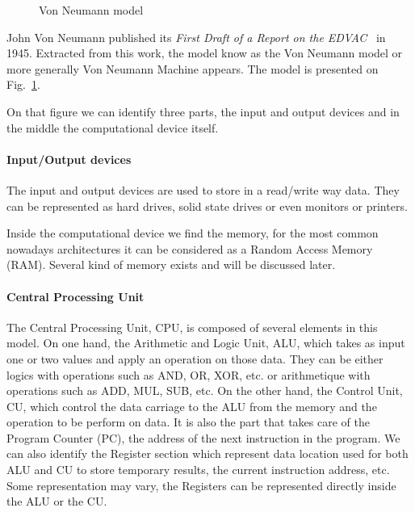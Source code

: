 \begin{figure}
\centering 
{}
\caption{Von Neumann model}
\label{fig:1_HPC:von_neumann_model}
\end{figure}

John Von Neumann published its \textit{First Draft of a Report on the EDVAC}~\cite{von1993first} in 1945. 
Extracted from this work, the model know as the Von Neumann model or more generally Von Neumann Machine appears. 
The model is presented on Fig.~\ref{fig:1_HPC:von_neumann_model}.

On that figure we can identify three parts, the input and output devices and in the middle the computational device itself. 
\paragraph{Input/Output devices}
The input and output devices are used to store in a read/write way data. 
They can be represented as hard drives, solid state drives or even monitors or printers. 

Inside the computational device we find the memory, for the most common nowadays architectures it can be considered as a Random Access Memory (RAM). 
Several kind of memory exists and will be discussed later. 
\paragraph{Central Processing Unit}
The Central Processing Unit, CPU, is composed of several elements in this model. 
On one hand, the Arithmetic and Logic Unit, ALU, which takes as input one or two values and apply an operation on those data. 
They can be either logics with operations such as AND, OR, XOR, etc. or arithmetique with operations such as ADD, MUL, SUB, etc.
On the other hand, the Control Unit, CU, which control the data carriage to the ALU from the memory and the operation to be perform on data.
It is also the part that takes care of the Program Counter (PC), the address of the next instruction in the program. 
We can also identify the Register section which represent data location used for both ALU and CU to store temporary results, the current instruction address, etc. 
Some representation may vary, the Registers can be represented directly inside the ALU or the CU. 
